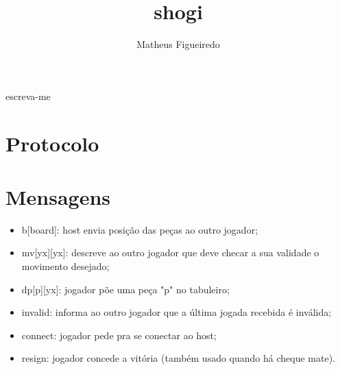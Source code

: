 \documentclass[12pt]{article}
\title{shogi}
\author{Matheus Figueiredo}
\begin{document}
\maketitle

\begin{abstract}
\end{abstract}

\begin{resumo}
  escreva-me
\end{resumo}

\newpage
\section{Protocolo}
\centering


\section{Mensagens}
\begin{itemize}
\item b[board]: host envia posição das peças ao outro jogador;
\item mv[yx][yx]: descreve ao outro jogador que deve checar a sua validade o movimento desejado;
\item dp[p][yx]: jogador põe uma peça "p" no tabuleiro;
\item invalid: informa ao outro jogador que a última jogada recebida é inválida;
\item connect: jogador pede pra se conectar ao host;
\item resign: jogador concede a vitória (também usado quando há cheque mate).
\end{itemize}



\end{document}
